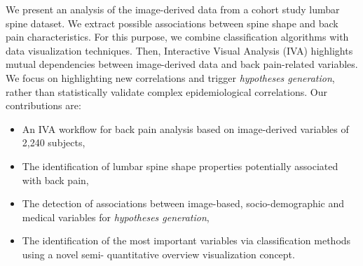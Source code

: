 \documentclass[a4paper,twoside]{style/article}
\begin{document}
We present an analysis of the image-derived data from a cohort study lumbar spine dataset.
We extract possible associations between spine shape and back pain characteristics.
For this purpose, we combine classification algorithms with data visualization techniques.
Then, Interactive Visual Analysis (IVA) highlights mutual dependencies between image-derived data and back pain-related variables.
We focus on highlighting new correlations and trigger \emph{hypotheses generation}, rather than statistically validate complex epidemiological correlations.
Our contributions are:
\begin{itemize}
\item An IVA workflow for back pain analysis based on image-derived variables of 2,240 subjects,
\item The identification of lumbar spine shape properties potentially associated with back pain,
\item The detection of associations between image-based, socio-demographic and medical variables for \emph{hypotheses generation},
\item The identification of the most important variables via classification methods using a novel semi- quantitative overview visualization concept. %
\end{itemize}
\end{document}
